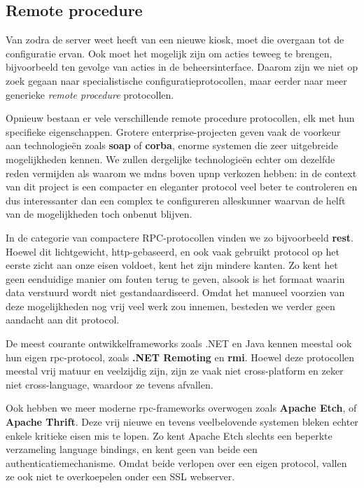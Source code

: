 \subsection{Remote procedure}

Van zodra de server weet heeft van een nieuwe kiosk, moet die overgaan tot de configuratie ervan. Ook moet het mogelijk zijn om acties teweeg te brengen, bijvoorbeeld ten gevolge van acties in de beheersinterface. Daarom zijn we niet op zoek gegaan naar specialistische configuratieprotocollen, maar eerder naar meer generieke \emph{remote procedure} protocollen.

Opnieuw bestaan er vele verschillende remote procedure protocollen, elk met hun specifieke eigenschappen. Grotere enterprise-projecten geven vaak de voorkeur aan technologieën zoals \textbf{\ac{soap}} of \textbf{\ac{corba}}, enorme systemen die zeer uitgebreide mogelijkheden kennen. We zullen dergelijke technologieën echter om dezelfde reden vermijden als waarom we \ac{mdns} boven \ac{upnp} verkozen hebben: in de context van dit project is een compacter en eleganter protocol veel beter te controleren en dus interessanter dan een complex te configureren alleskunner waarvan de helft van de mogelijkheden toch onbenut blijven.

In de categorie van compactere RPC-protocollen vinden we zo bijvoorbeeld \textbf{\ac{rest}}. Hoewel dit lichtgewicht, \ac{http}-gebaseerd, en ook vaak gebruikt protocol op het eerste zicht aan onze eisen voldoet, kent het zijn mindere kanten. Zo kent het geen eenduidige manier om fouten terug te geven, alsook is het formaat waarin data verstuurd wordt niet gestandaardiseerd. Omdat het manueel voorzien van deze mogelijkheden nog vrij veel werk zou innemen, besteden we verder geen aandacht aan dit protocol.

De meest courante ontwikkelframeworks zoals .NET en Java kennen meestal ook hun eigen \ac{rpc}-protocol, zoals \textbf{.NET Remoting} en \textbf{\ac{rmi}}. Hoewel deze protocollen meestal vrij matuur en veelzijdig zijn, zijn ze vaak niet cross-platform en zeker niet cross-language, waardoor ze tevens afvallen.

Ook hebben we meer moderne \ac{rpc}-frameworks overwogen zoals \textbf{Apache Etch}, of \textbf{Apache Thrift}. Deze vrij nieuwe en tevens veelbelovende systemen bleken echter enkele kritieke eisen mis te lopen. Zo kent Apache Etch slechts een beperkte verzameling language bindings, en kent geen van beide een authenticatiemechanisme. Omdat beide verlopen over een eigen protocol, vallen ze ook niet te overkoepelen onder een SSL webserver.


